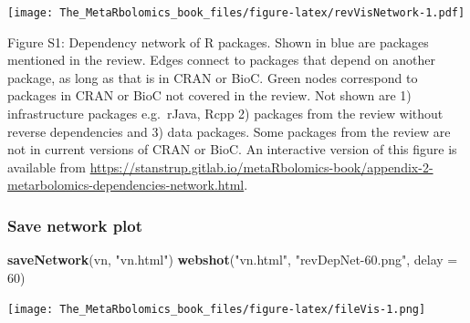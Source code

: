 \documentclass[]{article}
\newenvironment{Shaded}{\begin{snugshade}}{\end{snugshade}}
\newcommand{\DataTypeTok}[1]{\textcolor[rgb]{0.13,0.29,0.53}{#1}}
\newcommand{\DecValTok}[1]{\textcolor[rgb]{0.00,0.00,0.81}{#1}}
\newcommand{\KeywordTok}[1]{\textcolor[rgb]{0.13,0.29,0.53}{\textbf{#1}}}
\newcommand{\NormalTok}[1]{#1}
\newcommand{\OperatorTok}[1]{\textcolor[rgb]{0.81,0.36,0.00}{\textbf{#1}}}
\newcommand{\StringTok}[1]{\textcolor[rgb]{0.31,0.60,0.02}{#1}}
\begin{document}
\texttt{[image: The\_MetaRbolomics\_book\_files/figure-latex/revVisNetwork-1.pdf]}

Figure S1: Dependency network of R packages. Shown in blue are packages mentioned in the review. Edges connect to packages that depend on another package, as long as that is in CRAN or BioC. Green nodes correspond to packages in CRAN or BioC not covered in the review. Not shown are 1) infrastructure packages e.g.~rJava, Rcpp 2) packages from the review without reverse dependencies and 3) data packages. Some packages from the review are not in current versions of CRAN or BioC. An interactive version of this figure is available from \href{appendix-2-metarbolomics-dependencies-network.html}{https://stanstrup.gitlab.io/metaRbolomics-book/appendix-2-metarbolomics-dependencies-network.html}.

\hypertarget{save-network-plot}{%
\subsubsection*{Save network plot}\label{save-network-plot}}

\begin{Shaded}
\begin{Highlighting}[]
\KeywordTok{saveNetwork}\NormalTok{(vn, }\StringTok{"vn.html"}\NormalTok{)}
\KeywordTok{webshot}\NormalTok{(}\StringTok{"vn.html"}\NormalTok{, }\StringTok{"revDepNet-60.png"}\NormalTok{, }\DataTypeTok{delay =} \DecValTok{60}\NormalTok{)}
\end{Highlighting}
\end{Shaded}

\texttt{[image: The\_MetaRbolomics\_book\_files/figure-latex/fileVis-1.png]}

\begin{Shaded}
\end{Shaded}
\end{document}
